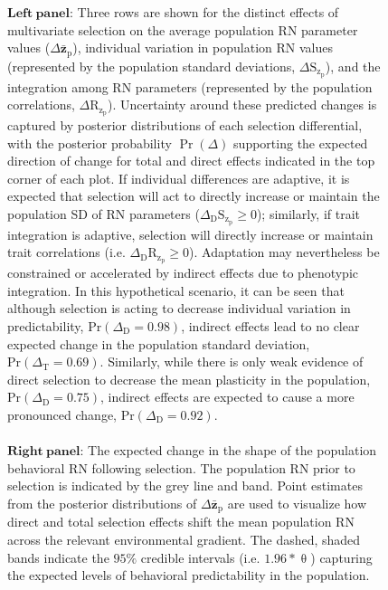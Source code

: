 \documentclass{article}
\begin{document}
\begin{figure}
{$\boldsymbol{Left \ panel}$: Three rows are shown for the distinct effects of multivariate selection on the average population RN parameter values ($\Delta \boldsymbol{\bar{z}}_\mathrm{p}$), individual variation in population RN values (represented by the population standard deviations, $\Delta \boldsymbol{\mathrm{S}}_\mathrm{z_p}$), and the integration among RN parameters (represented by the population correlations, $\Delta \boldsymbol{\mathrm{R}}_\mathrm{z_p}$). Uncertainty around these predicted changes is captured by posterior distributions of each selection differential, with the posterior probability $\Pr(\Delta)$ supporting the expected direction of change for total and direct effects indicated in the top corner of each plot. If individual differences are adaptive, it is expected that selection will act to directly increase or maintain the population SD of RN parameters ($\Delta_{\mathrm{D}} \boldsymbol{\mathrm{S}}_\mathrm{z_p} \geq 0$); similarly, if trait integration is adaptive, selection will directly increase or maintain trait correlations (i.e. $\Delta_{\mathrm{D}} \boldsymbol{\mathrm{R}}_\mathrm{z_p} \geq 0$). Adaptation may nevertheless be constrained or accelerated by indirect effects due to phenotypic integration. In this hypothetical scenario, it can be seen that although selection is acting to decrease individual variation in predictability, $\mathrm{Pr}(\Delta_{\mathrm{D}}=0.98 )$, indirect effects lead to no clear expected change in the population standard deviation, $\mathrm{Pr}(\Delta_{\mathrm{T}}=0.69 )$. Similarly, while there is only weak evidence of direct selection to decrease the mean plasticity in the population, $\mathrm{Pr}(\Delta_{\mathrm{D}}=0.75 )$, indirect effects are expected to cause a more pronounced change, $\mathrm{Pr}(\Delta_{\mathrm{D}}=0.92 )$.    \\ \\
$\boldsymbol{Right \ panel}$: The expected change in the shape of the population behavioral RN following selection. The population RN prior to selection is indicated by the grey line and band. Point estimates from the posterior distributions of $\Delta \boldsymbol{\bar{z}}_\mathrm{p}$ are used to visualize how direct and total selection effects shift the mean population RN across the relevant environmental gradient. The dashed, shaded bands indicate the $95\%$ credible intervals (i.e. $1.96*\uptheta$) capturing the expected levels of behavioral predictability in the population.
}
\label{fig:fig3}
\end{figure}
\end{document}
